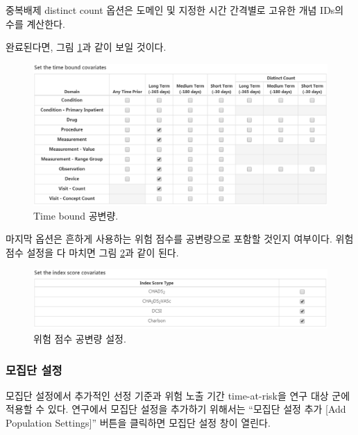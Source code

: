 \documentclass[10.5pt]{book}
\theoremstyle{definition}
\theoremstyle{definition}
\theoremstyle{definition}
\theoremstyle{remark}
\begin{document}
중복배제 distinct count 옵션은 도메인 및 지정한 시간 간격별로 고유한
개념 IDs의 수를 계산한다.

완료된다면, 그림 \ref{fig:covariateSettings5}과 같이 보일 것이다.

\begin{figure}

{\centering \includegraphics[width=1\linewidth]{images/PatientLevelPrediction/covariateSettings5} 

}

\caption{Time bound 공변량.}\label{fig:covariateSettings5}
\end{figure}

마지막 옵션은 흔하게 사용하는 위험 점수를 공변량으로 포함할 것인지
여부이다. 위험점수 설정을 다 마치면 그림 \ref{fig:covariateSettings6}과
같이 된다.

\begin{figure}

{\centering \includegraphics[width=1\linewidth]{images/PatientLevelPrediction/covariateSettings6} 

}

\caption{위험 점수 공변량 설정.}\label{fig:covariateSettings6}
\end{figure}

\subsubsection*{모집단 설정}\label{-}

모집단 설정에서 추가적인 선정 기준과 위험 노출 기간 time-at-risk을 연구
대상 군에 적용할 수 있다. 연구에서 모집단 설정을 추가하기 위해서는
``모집단 설정 추가 {[}Add Population Settings{]}'' 버튼을 클릭하면
모집단 설정 창이 열린다.
\end{document}
